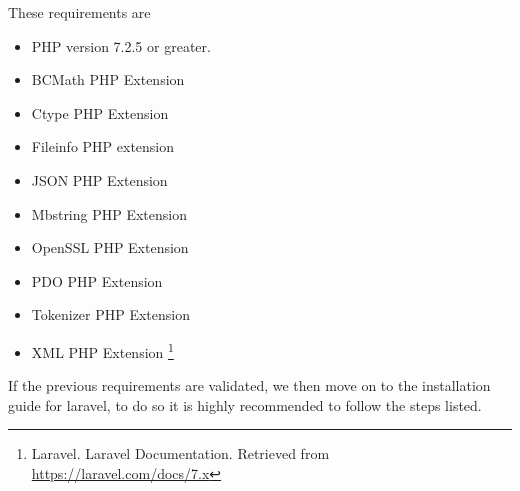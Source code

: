 \medskip These requirements are 
\begin{itemize}
    \item PHP version 7.2.5 or greater. 
    \item BCMath PHP Extension
    \item Ctype PHP Extension
    \item Fileinfo PHP extension
    \item JSON PHP Extension
    \item Mbstring PHP Extension
    \item OpenSSL PHP Extension
    \item PDO PHP Extension
    \item Tokenizer PHP Extension
    \item XML PHP Extension
\footnote{Laravel. Laravel Documentation. Retrieved from \url{https://laravel.com/docs/7.x} }
\end{itemize}
 \medskip If the previous requirements are validated, we then move on to the installation guide for laravel, to do so it is highly recommended to follow the steps listed.
